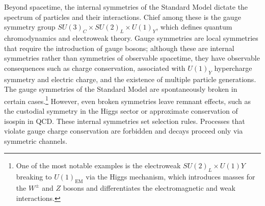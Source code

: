         Beyond spacetime, the internal symmetries of the Standard Model dictate the spectrum of particles and their interactions.
        Chief among these is the gauge symmetry group $SU(3)_C \times SU(2)_L \times U(1)_Y$, which defines quantum chromodynamics and electroweak theory.
        Gauge symmetries are local symmetries that require the introduction of gauge bosons;
        although these are internal symmetries rather than symmetries of observable spacetime, they have observable consequences such as charge conservation, associated with $U(1)_Y$ hypercharge symmetry and electric charge, and the existence of multiple particle generations.
        The gauge symmetries of the Standard Model are spontaneously broken in certain cases.\footnote{One of the most notable examples is the electroweak $SU(2)_L \times U(1)Y$ breaking to $U(1)_{\text{EM}}$ via the Higgs mechanism, which introduces masses for the $W^\pm$ and $Z$ bosons and differentiates the electromagnetic and weak interactions.}
        However, even broken symmetries leave remnant effects, such as the custodial symmetry in the Higgs sector or approximate conservation of isospin in QCD.
        These internal symmetries set selection rules.
        Processes that violate gauge charge conservation are forbidden and decays proceed only via symmetric channels.

